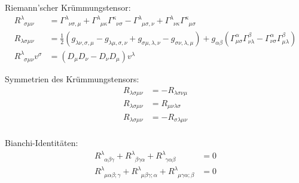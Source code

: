\documentclass[11pt]{article}
\numberwithin{equation}{section}
\begin{document}
          Riemann'scher Krümmungstensor:
          \begin{equation}
            \begin{aligned}
              R^{\lambda}_{\phantom{\lambda}\sigma\mu\nu} &= \Gamma^{\lambda}_{\phantom{\lambda}\nu\sigma,\mu}
              + \Gamma^{\lambda}_{\phantom{\lambda}\mu\kappa}\Gamma^{\kappa}_{\phantom{\kappa}\nu\sigma}
              -
              \Gamma^{\lambda}_{\phantom{\lambda}\mu\sigma,\nu}
              + \Gamma^{\lambda}_{\phantom{\lambda}\nu\kappa}\Gamma^{\kappa}_{\phantom{\kappa}\mu\sigma} \\
              R_{\lambda\sigma\mu\nu} &= \frac{1}{2}\left(
                g_{\lambda\nu,\sigma,\mu} - g_{\lambda\mu,\sigma,\nu} + g_{\sigma\mu,\lambda,\nu} - g_{\sigma\nu,\lambda,\mu}
              \right)
              + g_{\alpha\beta} \left(
                \Gamma^{\alpha}_{\mu\sigma} \Gamma^{\beta}_{\nu\lambda} - \Gamma^{\alpha}_{\nu\sigma} \Gamma^{\beta}_{\mu\lambda}
              \right)
              \\
              R^{\lambda}_{\phantom{\lambda}\sigma\mu\nu}v^\sigma &= \left(D_\mu D_\nu - D_\nu D_\mu \right) v^\lambda
            \end{aligned}
          \end{equation}

          Symmetrien des Krümmungstensors:
          \begin{equation}
            \begin{aligned}
              R_{\lambda\sigma\mu\nu} &= - R_{\lambda\sigma\nu\mu} \\
              R_{\lambda\sigma\mu\nu} &= R_{\mu\nu\lambda\sigma} \\
              R_{\lambda\sigma\mu\nu} &= -
              R_{\sigma\lambda\mu\nu} \\
            \end{aligned}
          \end{equation}

          Bianchi-Identitäten:
          \begin{equation}
            \begin{aligned}
              R^{\lambda}_{\phantom{\lambda}\alpha\beta\gamma} + R^{\lambda}_{\phantom{\lambda}\beta\gamma\alpha} + R^{\lambda}_{\phantom{\lambda}\gamma\alpha\beta} &= 0 \\
              R^{\lambda}_{\phantom{\lambda}\mu\alpha\beta;\gamma} + R^{\lambda}_{\phantom{\lambda}\mu\beta\gamma;\alpha} + R^{\lambda}_{\phantom{\lambda}\mu\gamma\alpha;\beta} &= 0 \\
            \end{aligned}
          \end{equation}
\end{document}
